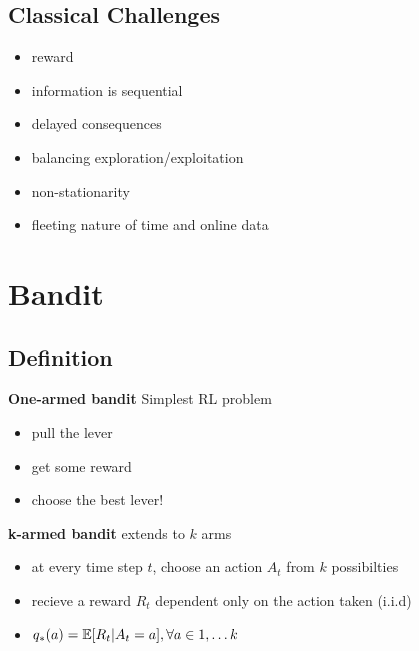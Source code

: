 \documentclass[]{article}
\theoremstyle{definition}
\newcommand{\E}{\mathbb{E}}
\begin{document}
\subsection{Classical Challenges}
\label{sub:classical_challenges}
\begin{itemize}
    \item reward
    \item information is sequential
    \item delayed consequences
    \item balancing exploration/exploitation
    \item non-stationarity
    \item fleeting nature of time and online data
\end{itemize}


\section{Bandit}
\label{sec:bandit}

\subsection{Definition}
\label{sub:definition}

\textbf{One-armed bandit} Simplest RL problem
\begin{itemize}
    \item pull the lever
    \item get some reward
    \item choose the best lever!
\end{itemize}

\textbf{k-armed bandit} extends to $k$ arms
\begin{itemize}
    \item at every time step $t$, choose an action $A_t$ from $k$ possibilties
    \item recieve a reward $R_t$ dependent only on the action taken (i.i.d)
    \item $q_*(a) = \E [R_t | A_t = a], \medskip \forall a \in {1, \ldots k }$
\end{itemize}
\end{document}
